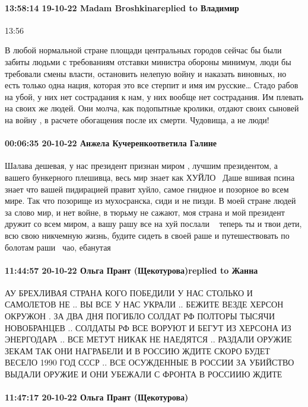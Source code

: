 \paragraph{13:58:14 19-10-22 Madam Broshkinareplied to Владимир}
13:56

В любой нормальной стране площади центральных городов сейчас бы были забиты
людьми с требованиям отставки министра обороны минимум, люди бы требовали смены
власти, остановить нелепую войну и наказать виновных, но есть только одна
нация, которая это все стерпит и имя им русские…
Стадо рабов на убой, у них нет сострадания к нам, у них вообще нет сострадания. Им плевать на своих же людей. Они молча, как подопытные кролики, отдают своих сыновей на войну , в расчете обогащения после их смерти. Чудовища, а не люди!


\paragraph{00:06:35 20-10-22 Анжела Кучеренкоответила Галине}

Шалава дешевая, у нас президент признан миром , лучшим президентом, а вашего
бункерного плешивца, весь мир знает как ХУЙЛО🤣🤣🤣Даше вшивая псина знает что
вашей пидирацией правит хуйло, самое гнидное и позорное во всем мире. Так что
позорище из мухосранска, сиди и не пизди. В моей стране людей за слово мир, и
нет войне, в тюрьму не сажают, моя страна и мой президент дружит со всем миром,
а вашу рашу все на хуй послали🤣🤣🤣 теперь ты и твои дети, всю свою никчемную
жизнь, будите сидеть в своей раше и путешествовать по болотам раши🤣🤣🤣чао,
ебанутая

\paragraph{11:44:57 20-10-22 Ольга Прант (Щекотурова)replied to Жанна}

АУ БРЕХЛИВАЯ СТРАНА КОГО ПОБЕДИЛИ У НАС СТОЛЬКО И САМОЛЕТОВ НЕ .. ВЫ ВСЕ У НАС
УКРАЛИ .. БЕЖИТЕ ВЕЗДЕ ХЕРСОН ОКРУЖОН . ЗА ДВА ДНЯ ПОГИБЛО СОЛДАТ РФ ПОЛТОРЫ
ТЫСЯЧИ НОВОБРАНЦЕВ .. СОЛДАТЫ РФ ВСЕ ВОРУЮТ И БЕГУТ ИЗ ХЕРСОНА ИЗ ЭНЕРГОДАРА ..
ВСЕ МЕТУТ НИКАК НЕ НАЕДЯТСЯ .. РАЗДАЛИ ОРУЖИЕ ЗЕКАМ ТАК ОНИ НАГРАБЕЛИ И В
РОССИЮ ЖДИТЕ СКОРО БУДЕТ ВЕСЕЛО 1990 ГОД СССР .. ВСЕ ОСУЖДЕННЫЕ В РОССИИ ЗА
УБИЙСТВО ВЫДАЛИ ОРУЖИЕ И ОНИ УБЕЖАЛИ С ФРОНТА В РОССИИЮ ЖДИТЕ

\paragraph{11:47:17 20-10-22 Ольга Прант (Щекотурова)}

